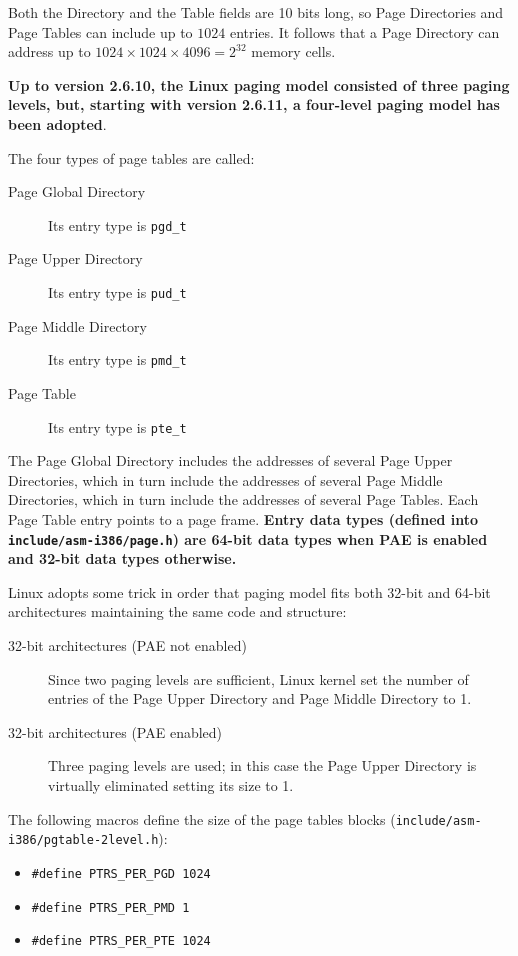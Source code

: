 \documentclass[10pt,a4paper]{article}
\begin{document}
Both the Directory and the Table fields are 10 bits long, so Page Directories and Page Tables can include up to $1024$ entries. It follows that a Page Directory can address
up to $1024 \times 1024 \times 4096=2^{32}$ memory cells.


\textbf{Up to version 2.6.10, the Linux paging model consisted of three paging levels, but, starting with version 2.6.11, a four-level paging model has been adopted}.

The four types of page tables are called:
\begin{description}
\item[Page Global Directory] Its entry type is \texttt{pgd\_t}
\item[Page Upper Directory] Its entry type is \texttt{pud\_t}
\item[Page Middle Directory] Its entry type is \texttt{pmd\_t}
\item[Page Table] Its entry type is \texttt{pte\_t}
\end{description}


The Page Global Directory includes the addresses of several Page Upper Directories, which in turn include the addresses of several Page Middle Directories, which in
turn include the addresses of several Page Tables. Each Page Table entry points to a page frame. \textbf{Entry data types (defined into \texttt{include/asm-i386/page.h}) are 64-bit data types when PAE is enabled and 32-bit data types otherwise.}

Linux adopts some trick in order that paging model fits both 32-bit and 64-bit architectures maintaining the same code and structure:
\begin{description}
\item[32-bit architectures (PAE not enabled)] Since two paging levels are sufficient, Linux kernel set the number of entries of the Page Upper Directory and Page Middle Directory to 1.
\item[32-bit architectures (PAE enabled)] Three paging levels are used; in this case the Page Upper Directory is virtually eliminated setting its size to 1.
\end{description}

The following macros define the size of the page tables blocks (\texttt{include/asm-i386/pgtable-2level.h}):
\begin{itemize}
\item \texttt{\#define PTRS\_PER\_PGD    1024}
\item \texttt{\#define PTRS\_PER\_PMD    1}
\item \texttt{\#define PTRS\_PER\_PTE    1024}
\end{itemize}
\end{document}
